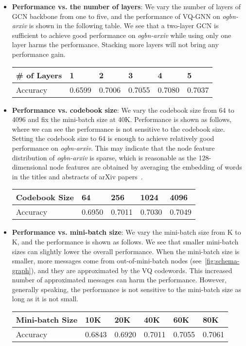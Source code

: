 \documentclass{article}
\begin{document}
\begin{itemize}[leftmargin=*, topsep=1.5pt]
\setlength\itemsep{0.75pt}
    \item \textbf{Performance vs. the number of layers}: We vary the number of layers of GCN backbone from one to five, and the performance of VQ-GNN on \textit{ogbn-arxiv} is shown in the following table. We see that a two-layer GCN is sufficient to achieve good performance on \textit{ogbn-arxiv} while using only one layer harms the performance. Stacking more layers will not bring any performance gain.
\begin{table}[H]
\begin{tabular}{llllll} \toprule
\# of Layers & 1      & 2      & 3      & 4      & 5      \\ \midrule
Accuracy     & 0.6599 & 0.7006 & 0.7055 & 0.7080 & 0.7037 \\ \bottomrule
\end{tabular}
\end{table}
    
    \item  \textbf{Performance vs. codebook size}: We vary the codebook size from 64 to 4096 and fix the mini-batch size at 40K. Performance is shown as follows, where we can see the performance is not sensitive to the codebook size. Setting the codebook size to 64 is enough to achieve relatively good performance on \textit{ogbn-arxiv}. This may indicate that the node feature distribution of \textit{ogbn-arxiv} is sparse, which is reasonable as the 128-dimensional node features are obtained by averaging the embedding of words in the titles and abstracts of arXiv papers~\citep{hu2020open}.
\begin{table}[H]
\begin{tabular}{lllll} \toprule
Codebook Size & 64     & 256    & 1024   & 4096   \\ \midrule
Accuracy      & 0.6950 & 0.7011 & 0.7030 & 0.7049 \\ \bottomrule
\end{tabular}
\end{table}

    \item \textbf{Performance vs. mini-batch size}: We vary the mini-batch size from K to K, and the performance is shown as follows. We see that smaller mini-batch sizes can slightly lower the overall performance. When the mini-batch size is smaller, more messages come from out-of-mini-batch nodes (see~\cref{fig:schema-graph}), and they are approximated by the VQ codewords. This increased number of approximated messages can harm the performance. However, generally speaking, the performance is not sensitive to the mini-batch size as long as it is not small.
\begin{table}[H]
\begin{tabular}{llllll} \toprule
Mini-batch Size & 10K    & 20K    & 40K    & 60K    & 80K    \\ \midrule
Accuracy        & 0.6843 & 0.6920 & 0.7011 & 0.7055 & 0.7061 \\ \bottomrule
\end{tabular}
\end{table}


\end{itemize}
\end{document}
